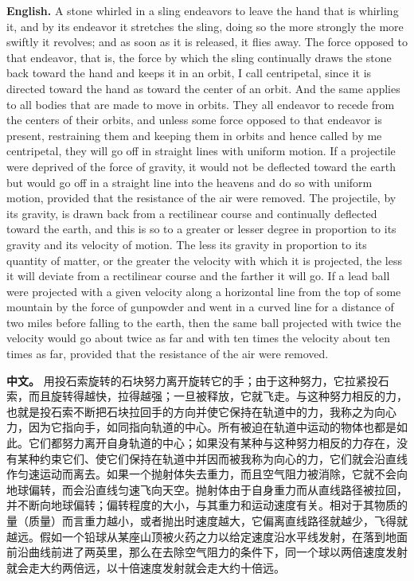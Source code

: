 \noindent\textbf{English.} A stone whirled in a sling endeavors to leave the hand that is whirling it, and by its endeavor it stretches the sling, doing so the more strongly the more swiftly it revolves; and as soon as it is released, it flies away. The force opposed to that endeavor, that is, the force by which the sling continually draws the stone back toward the hand and keeps it in an orbit, I call centripetal, since it is directed toward the hand as toward the center of an orbit. And the same applies to all bodies that are made to move in orbits. They all endeavor to recede from the centers of their orbits, and unless some force opposed to that endeavor is present, restraining them and keeping them in orbits and hence called by me centripetal, they will go off in straight lines with uniform motion. If a projectile were deprived of the force of gravity, it would not be deflected toward the earth but would go off in a straight line into the heavens and do so with uniform motion, provided that the resistance of the air were removed. The projectile, by its gravity, is drawn back from a rectilinear course and continually deflected toward the earth, and this is so to a greater or lesser degree in proportion to its gravity and its velocity of motion. The less its gravity in proportion to its quantity of matter, or the greater the velocity with which it is projected, the less it will deviate from a rectilinear course and the farther it will go. If a lead ball were projected with a given velocity along a horizontal line from the top of some mountain by the force of gunpowder and went in a curved line for a distance of two miles before falling to the earth, then the same ball projected with twice the velocity would go about twice as far and with ten times the velocity about ten times as far, provided that the resistance of the air were removed.
\par\noindent\textbf{中文。} 用投石索旋转的石块努力离开旋转它的手；由于这种努力，它拉紧投石索，而且旋转得越快，拉得越强；一旦被释放，它就飞走。与这种努力相反的力，也就是投石索不断把石块拉回手的方向并使它保持在轨道中的力，我称之为向心力，因为它指向手，如同指向轨道的中心。所有被迫在轨道中运动的物体也都是如此。它们都努力离开自身轨道的中心；如果没有某种与这种努力相反的力存在，没有某种约束它们、使它们保持在轨道中并因而被我称为向心的力，它们就会沿直线作匀速运动而离去。如果一个抛射体失去重力，而且空气阻力被消除，它就不会向地球偏转，而会沿直线匀速飞向天空。抛射体由于自身重力而从直线路径被拉回，并不断向地球偏转；偏转程度的大小，与其重力和运动速度有关。相对于其物质的量（质量）而言重力越小，或者抛出时速度越大，它偏离直线路径就越少，飞得就越远。假如一个铅球从某座山顶被火药之力以给定速度沿水平线发射，在落到地面前沿曲线前进了两英里，那么在去除空气阻力的条件下，同一个球以两倍速度发射就会走大约两倍远，以十倍速度发射就会走大约十倍远。
\medskip

